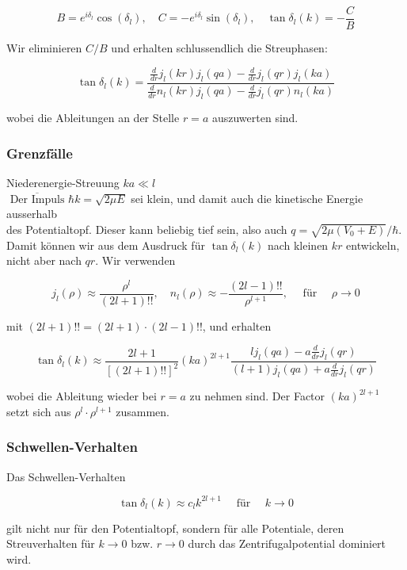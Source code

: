 \documentclass[10pt, letterpaper]{article}
\begin{document}
$$
B=e^{i \delta_{l}} \cos \left(\delta_{l}\right), \quad C=-e^{i \delta_{l}} \sin \left(\delta_{l}\right), \quad \tan \delta_{l}(k)=-\frac{C}{B}
$$

Wir eliminieren $C / B$ und erhalten schlussendlich die Streuphasen:

$$
\tan \delta_{l}(k)=\frac{\frac{d}{d r} j_{l}(k r) j_{l}(q a)-\frac{d}{d r} j_{l}(q r) j_{l}(k a)}{\frac{d}{d r} n_{l}(k r) j_{l}(q a)-\frac{d}{d r} j_{l}(q r) n_{l}(k a)}
$$

wobei die Ableitungen an der Stelle $r=a$ auszuwerten sind.

\subsubsection*{Grenzfälle}
Niederenergie-Streuung $k a \ll l$\\
$\overline{\text { Der Impuls }} \hbar k=\sqrt{2 \mu E}$ sei klein, und damit auch die kinetische Energie ausserhalb\\
des Potentialtopf. Dieser kann beliebig tief sein, also auch $q=\sqrt{2 \mu\left(V_{0}+E\right)} / \hbar$. Damit können wir aus dem Ausdruck für $\tan \delta_{l}(k)$ nach kleinen $k r$ entwickeln, nicht aber nach $q r$. Wir verwenden

$$
j_{l}(\rho) \approx \frac{\rho^{l}}{(2 l+1)!!}, \quad n_{l}(\rho) \approx-\frac{(2 l-1)!!}{\rho^{l+1}}, \quad \text { für } \quad \rho \rightarrow 0
$$

mit $(2 l+1)!!=(2 l+1) \cdot(2 l-1)!!$, und erhalten

$$
\tan \delta_{l}(k) \approx \frac{2 l+1}{[(2 l+1)!!]^{2}}(k a)^{2 l+1} \frac{l j_{l}(q a)-a \frac{d}{d r} j_{l}(q r)}{(l+1) j_{l}(q a)+a \frac{d}{d r} j_{l}(q r)}
$$

wobei die Ableitung wieder bei $r=a$ zu nehmen sind. Der Factor $(k a)^{2 l+1}$ setzt sich aus $\rho^{l} \cdot \rho^{l+1}$ zusammen.

\subsubsection*{Schwellen-Verhalten}
Das Schwellen-Verhalten

$$
\tan \delta_{l}(k) \approx c_{l} k^{2 l+1} \quad \text { für } \quad k \rightarrow 0
$$

gilt nicht nur für den Potentialtopf, sondern für alle Potentiale, deren Streuverhalten für $k \rightarrow 0$ bzw. $r \rightarrow 0$ durch das Zentrifugalpotential dominiert wird.
\end{document}
